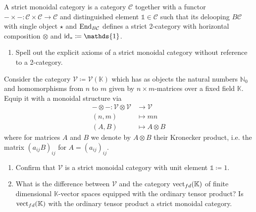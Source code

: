 \begin{Exercise}
	A strict monoidal category is a category $ \mathcal{ C } $ together with a functor $ - \times - \colon \mathcal{ C } \times \mathcal{ C } \to \mathcal{ C } $ and distinguished element $ \mathds{ 1 } \in \mathcal{ C } $ such that its delooping $ B \mathcal{ C } $ with single object $ \star $ and $ \operatorname{End}_{ B \mathcal{ C } } $ defines a strict 2-category with horizontal composition $ \otimes $ and $ \id_* \coloneqq \mathds{ 1 } $.
	\begin{enumerate}[label=(\alph*)]
		\item 
		Spell out the explicit axioms of a strict monoidal category without reference to a 2-category.
	\end{enumerate}
	
	Consider the category $ \mathcal{ V } \coloneqq \mathcal{ V } ( \mathbb{ K } ) $ which has as objects the natural numbers $ \mathbb{ N }_0 $ and homomorphisms from $ n $ to $ m $ given by $ n \times m $-matrices over a fixed field $ \mathbb{ K } $.
	Equip it with a monoidal structure via
	\begin{align*}
		- \otimes - \colon \mathcal{ V } \otimes \mathcal{ V } 
		&\to 
		\mathcal{ V } 
		\\
		( n , m ) 
		&\mapsto
		mn
		\\
		( A , B ) 
		&\mapsto
		A \otimes B
	\end{align*}
	where for matrices $ A $ and $ B $ we denote by $ A \otimes B $ their Kronecker product, i.e. the matrix $ ( a_{ij}B)_{ij}$ for $ A = ( a_{ij})_{ij}$.
	
	\begin{enumerate}[resume, label=(\alph*)]
		\item 
		Confirm that $ \mathcal{ V } $ is a strict monoidal category with unit element $ \mathds{ 1 } \coloneqq 1 $.
		
		\item 
		What is the difference between $ \mathcal{ V } $ and the category $ \operatorname{vect}_{fd} ( \mathbb{ K } ) $ of finite dimensional $ \mathbb{ K } $-vector spaces equipped with the ordinary tensor product?
		Is $ \operatorname{vect}_{fd} ( \mathbb{ K } ) $ with the ordinary tensor product a strict monoidal category.
	\end{enumerate}
\end{Exercise}

